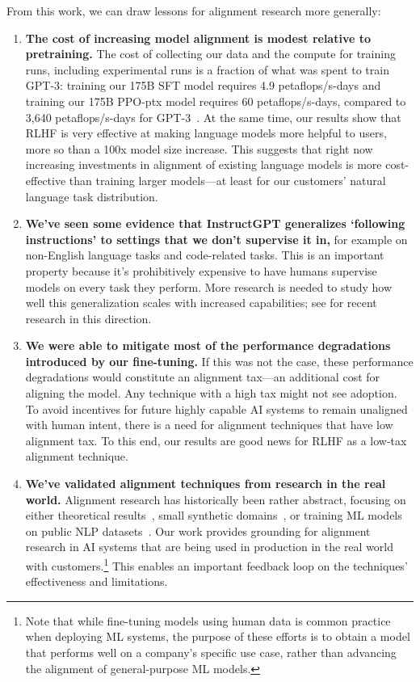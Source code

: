 From this work, we can draw lessons for alignment research more generally:

\begin{enumerate}
\item \textbf{The cost of increasing model alignment is modest relative to pretraining.} The cost of collecting our data and the compute for training runs, including experimental runs is a fraction of what was spent to train GPT-3: training our 175B SFT model requires 4.9 petaflops/s-days and training our 175B PPO-ptx model requires 60 petaflops/s-days, compared to 3,640 petaflops/s-days for GPT-3~\citep{brown2020language}. At the same time, our results show that RLHF is very effective at making language models more helpful to users, more so than a 100x model size increase. This suggests that right now increasing investments in alignment of existing language models is more cost-effective than training larger models---at least for our customers' natural language task distribution.
\item \textbf{We've seen some evidence that InstructGPT generalizes `following instructions' to settings that we don't supervise it in,} for example on non-English language tasks and code-related tasks. This is an important property because it's prohibitively expensive to have humans supervise models on every task they perform. More research is needed to study how well this generalization scales with increased capabilities; see \citet{christiano2021eliciting} for recent research in this direction. 
\item \textbf{We were able to mitigate most of the performance degradations introduced by our fine-tuning.} If this was not the case, these performance degradations would constitute an alignment tax---an additional cost for aligning the model. Any technique with a high tax might not see adoption. To avoid incentives for future highly capable AI systems to remain unaligned with human intent, there is a need for alignment techniques that have low alignment tax. To this end, our results are good news for RLHF as a low-tax alignment technique.
\item \textbf{We've validated alignment techniques from research in the real world.} Alignment research has historically been rather abstract, focusing on either theoretical results~\citep{soares2015corrigibility}, small synthetic domains~\citep{christiano2018supervising,leike2017ai}, or training ML models on public NLP datasets~\citep{ziegler2019fine,stiennon2020learning}. Our work provides grounding for alignment research in AI systems that are being used in production in the real world with customers.\footnote{Note that while fine-tuning models using human data is common practice when deploying ML systems, the purpose of these efforts is to obtain a model that performs well on a company's specific use case, rather than advancing the alignment of general-purpose ML models. } This enables an important feedback loop on the techniques' effectiveness and limitations.
\end{enumerate}

